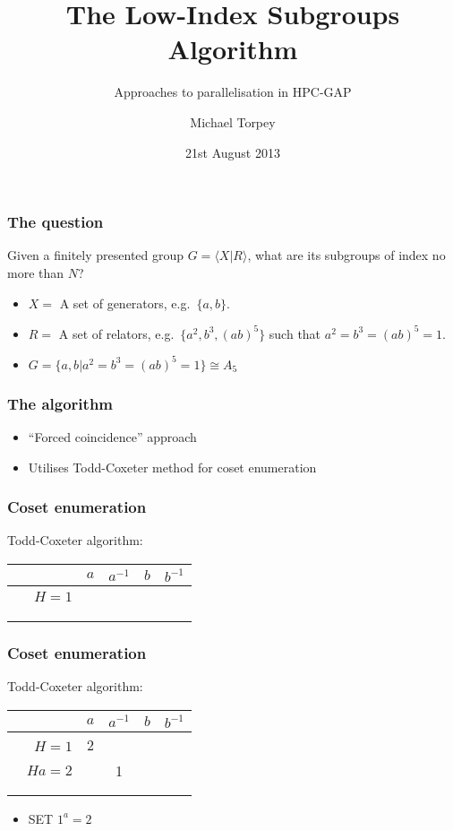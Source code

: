 \documentclass{beamer}
\title{The Low-Index Subgroups Algorithm}
\subtitle{Approaches to parallelisation in HPC-GAP}
\author{Michael Torpey}
\institute{University of St Andrews}
\date{21st August 2013}
\begin{document}
\maketitle

\begin{frame}
  \frametitle{The question}
  Given a finitely presented group $G = \langle X | R \rangle$, what are its subgroups of index no more than $N$?
  \begin{itemize}
  \item<2-> $X = $ A set of generators, e.g.~$\{a,b\}$.
  \item<3-> $R = $ A set of relators, e.g.~$\{a^2,b^3,(ab)^5\}$ such that $a^2=b^3=(ab)^5=1$.
  \item<4-> $G = \{a,b | a^2=b^3=(ab)^5=1\} \cong A_5$
  \end{itemize}
\end{frame}

\begin{frame}
  \frametitle{The algorithm}
  \begin{itemize}
  \item ``Forced coincidence'' approach
  \item Utilises Todd-Coxeter method for coset enumeration
  \end{itemize}
\end{frame}

\begin{frame}[t]
  \frametitle{Coset enumeration}
  \pause
  Todd-Coxeter algorithm:
  \pause
  \begin{table}
    \begin{tabular}{r | c c c c}
      & $a$ & $a^{-1}$ & $b$ & $b^{-1}$ \\ \hline
      $\phantom{b^{-1}}H=1$ & & & \phantom{3} & \\ \\ \\ \\
    \end{tabular}
  \end{table}

\end{frame}

\begin{frame}[t]
  \frametitle{Coset enumeration}
  Todd-Coxeter algorithm:
  \begin{table}
    \begin{tabular}{r | c c c c}
      & $a$ & $a^{-1}$ & $b$ & $b^{-1}$ \\ \hline
      $\phantom{b^{-1}}H=1$ & 2 & & \phantom{3} & \\
      $Ha=2$ & & 1 & & \\ \\ \\
    \end{tabular}
  \end{table}

  \begin{itemize}
  \item SET $1^a=2$
  \end{itemize}
\end{frame}
\end{document}
